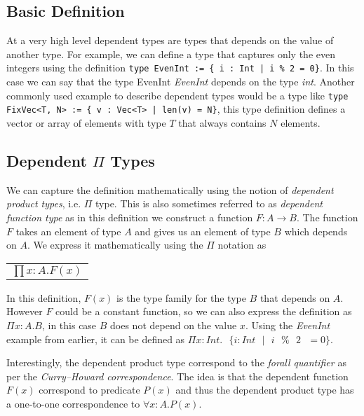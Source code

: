 \documentclass[a4paper,12pt]{report}
\begin{document}
\subsection{Basic Definition}
At a very high level dependent types are types that depends on the value of 
another type. For example, we can define a type that captures only the even 
integers using the definition 
\verb+type EvenInt := { i : Int | i % 2 = 0}+. In this case we 
can say that the type EvenInt \textit{EvenInt} depends on the type \textit{int}.
Another commonly used example to describe dependent types would be a type like 
\verb+type FixVec<T, N> := { v : Vec<T> | len(v) = N}+, this type definition defines 
a vector or array of elements with type $T$ that always contains $N$ elements.

\subsection{Dependent $\Pi$ Types}
We can capture the definition mathematically using the notion of \textit{dependent 
product types}, i.e. $\Pi$ type. This is also sometimes referred to as 
\textit{dependent function type} as in this definition we construct a function 
$F: A \rightarrow B$. The function $F$ takes an element of type $A$ and 
gives us an element of type $B$ which depends on $A$. We express it 
mathematically using the $\Pi$ notation as
\begin{center}
 \begin{tabular}{l}
   $\prod x: A.  F(x)$
 \end{tabular} 
\end{center}

In this definition, $F(x)$ is the type family for the type $B$ that depends on $A$.
However $F$ could be a constant function, so we can also express the definition 
as $\Pi x:A.B$, in this case $B$ does not depend 
on the value $x$. Using the \textit{EvenInt} example from earlier, 
it can be defined as 
$\Pi x:Int.\text{ }\{ i:Int\text{ }|\text{ }i\text{ }\%\text{ }2\text{ }= 0\}$.

\par
Interestingly, the dependent product type correspond to the 
\textit{forall quantifier} as per 
the \textit{Curry–Howard correspondence}. The idea is that the dependent 
function $F(x)$ correspond to predicate $P(x)$ and thus the dependent product 
type has a one-to-one correspondence to $\forall x: A. P(x)$.
\end{document}
